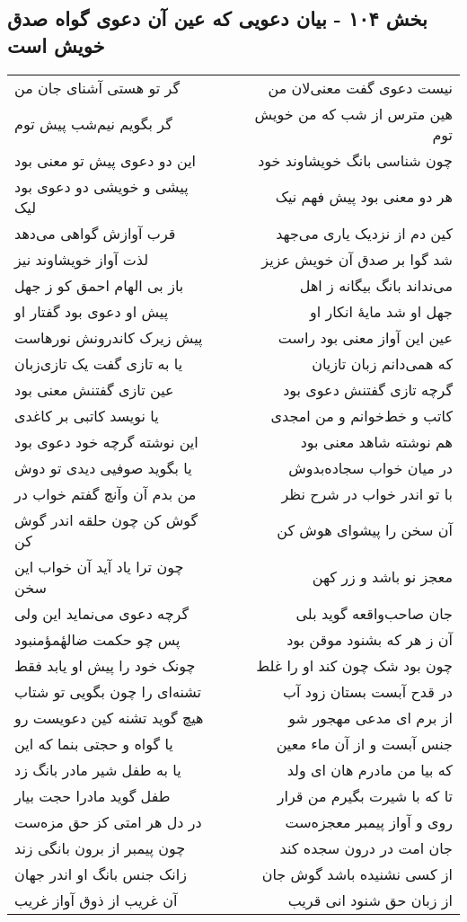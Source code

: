 \begin{center}
\section*{بخش ۱۰۴ - بیان دعویی که عین آن دعوی گواه  صدق خویش است}
\label{sec:sh104}
\begin{longtable}{l p{0.5cm} r}
گر تو هستی آشنای جان من
&&
نیست دعوی گفت معنی‌لان من
\\
گر بگویم نیم‌شب پیش توم
&&
هین مترس از شب که من خویش توم
\\
این دو دعوی پیش تو معنی بود
&&
چون شناسی بانگ خویشاوند خود
\\
پیشی و خویشی دو دعوی بود لیک
&&
هر دو معنی بود پیش فهم نیک
\\
قرب آوازش گواهی می‌دهد
&&
کین دم از نزدیک یاری می‌جهد
\\
لذت آواز خویشاوند نیز
&&
شد گوا بر صدق آن خویش عزیز
\\
باز بی الهام احمق کو ز جهل
&&
می‌نداند بانگ بیگانه ز اهل
\\
پیش او دعوی بود گفتار او
&&
جهل او شد مایهٔ انکار او
\\
پیش زیرک کاندرونش نورهاست
&&
عین این آواز معنی بود راست
\\
یا به تازی گفت یک تازی‌زبان
&&
که همی‌دانم زبان تازیان
\\
عین تازی گفتنش معنی بود
&&
گرچه تازی گفتنش دعوی بود
\\
یا نویسد کاتبی بر کاغدی
&&
کاتب و خط‌خوانم و من امجدی
\\
این نوشته گرچه خود دعوی بود
&&
هم نوشته شاهد معنی بود
\\
یا بگوید صوفیی دیدی تو دوش
&&
در میان خواب سجاده‌بدوش
\\
من بدم آن وآنچ گفتم خواب در
&&
با تو اندر خواب در شرح نظر
\\
گوش کن چون حلقه اندر گوش کن
&&
آن سخن را پیشوای هوش کن
\\
چون ترا یاد آید آن خواب این سخن
&&
معجز نو باشد و زر کهن
\\
گرچه دعوی می‌نماید این ولی
&&
جان صاحب‌واقعه گوید بلی
\\
پس چو حکمت ضالهٔمؤمنبود
&&
آن ز هر که بشنود موقن بود
\\
چونک خود را پیش او یابد فقط
&&
چون بود شک چون کند او را غلط
\\
تشنه‌ای را چون بگویی تو شتاب
&&
در قدح آبست بستان زود آب
\\
هیچ گوید تشنه کین دعویست رو
&&
از برم ای مدعی مهجور شو
\\
یا گواه و حجتی بنما که این
&&
جنس آبست و از آن ماء معین
\\
یا به طفل شیر مادر بانگ زد
&&
که بیا من مادرم هان ای ولد
\\
طفل گوید مادرا حجت بیار
&&
تا که با شیرت بگیرم من قرار
\\
در دل هر امتی کز حق مزه‌ست
&&
روی و آواز پیمبر معجزه‌ست
\\
چون پیمبر از برون بانگی زند
&&
جان امت در درون سجده کند
\\
زانک جنس بانگ او اندر جهان
&&
از کسی نشنیده باشد گوش جان
\\
آن غریب از ذوق آواز غریب
&&
از زبان حق شنود انی قریب
\\
\end{longtable}
\end{center}
